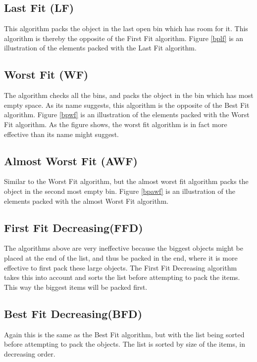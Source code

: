\subsection{Last Fit (LF)}
This algorithm packs the object in the last open bin which has room for it. This algorithm is thereby the opposite of the First Fit algorithm. Figure \ref{bplf} is an illustration of the elements packed with the Last Fit algorithm.

\subsection{Worst Fit (WF)}
The algorithm checks all the bins, and packs the object in the bin which has most empty space. As its name suggests, this algorithm is the opposite of the Best Fit algorithm. Figure \ref{bpwf} is an illustration of the elements packed with the Worst Fit algorithm. As the figure shows, the worst fit algorithm is in fact more effective than its name might suggest. 

\subsection{Almost Worst Fit (AWF)}
Similar to the Worst Fit algorithm, but the almost worst fit algorithm packs the object in the second most empty bin.  Figure \ref{bpawf} is an illustration of the elements packed with the almost Worst Fit algorithm.

\subsection{First Fit Decreasing(FFD)}
The algorithms above are very ineffective because the biggest objects might be placed at the end of the list, and thus be packed in the end, where it is more effective to first pack these large objects.
The First Fit Decreasing algorithm takes this into account and sorts the list before attempting to pack the items. This way the biggest items will be packed first.

\subsection{Best Fit Decreasing(BFD)}
Again this is the same as the Best Fit algorithm, but with the list being sorted before attempting to pack the objects. The list is sorted by size of the items, in decreasing order. 

